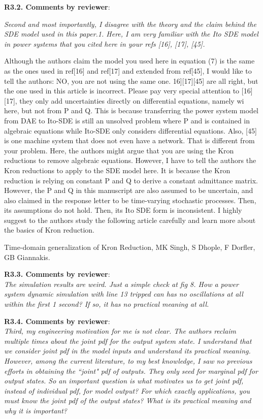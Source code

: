 \documentclass[12pt,onecolumn]{IEEEtran}
\newcommand{\blue}{\color{blue}}
\newcommand{\nib}{\noindent  {\bf Response:} }
\begin{document}
\noindent
{\bf R3.2. Comments by reviewer}:\\
{\em Second and most importantly, I disagree with the theory and the claim behind the SDE model used in this paper.1.     Here, I am very familiar with the Ito SDE model in power systems that you cited here in your refs [16], [17], [45].

Although the authors claim the model you used here in equation (7) is the same as the ones used in ref[16] and ref[17] and extended from ref[45], I would like to tell the authors: NO, you are not using the same one. 16][17][45] are all right, but the one used in this article is incorrect. Please pay very special attention to [16][17], they only add uncertainties directly on differential equations, namely wi here, but not from P and Q.  This is because transferring the power system model from DAE to Ito-SDE is still an unsolved problem where P and is contained in algebraic equations while Ito-SDE only considers differential equations. Also, [45] is one machine system that does not even have a network. That is different from your problem. Here, the authors might argue that you are using the Kron reductions to remove algebraic equations. However, I have to tell the authors the Kron reductions to apply to the SDE model here. It is because the Kron reduction is relying on constant P and Q to derive a constant admittance matrix.  However, the P and Q in this manuscript are also assumed to be uncertain, and also claimed in the response letter to be time-varying stochastic processes. Then, its assumptions do not hold.  Then, its Ito SDE form is inconsistent.  I highly suggest to the authors study the following article carefully and learn more about the basics of Kron reduction.

Time-domain generalization of Kron Reduction, MK Singh, S Dhople, F Dorfler, GB Giannakis.
}

{\nib \blue{\ul{The.}}
}


\noindent
{\bf R3.3. Comments by reviewer}:\\
{\em The simulation results are weird. Just a simple check at fig 8. How a power system dynamic simulation with line 13 tripped can has no oscillations at all within the first 1 second?  If so, it has no practical meaning at all.}

{\nib \blue{The.}}


\noindent
{\bf R3.4. Comments by reviewer}:\\
{\em Third, my engineering motivation for me is not clear. The authors reclaim multiple times about the joint pdf for the output system state.  I understand that we consider joint pdf in the model inputs and understand its practical meaning. However, among the current literature, to my best knowledge, I saw no previous efforts in obtaining the ``joint" pdf of outputs. They only seed for marginal pdf for output states. So an important question is what motivates us to get joint pdf, instead of individual pdf, for model output? For which exactly applications, you must know the joint pdf of the output states?  What is its practical meaning and why it is important?}
\end{document}
